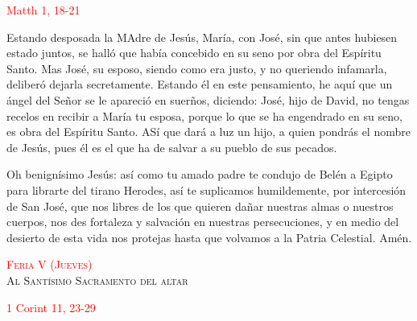 \documentclass[10pt]{article}
\begin{document}
\begin{multicols}{2}
      \hfill\textcolor{red}{Matth 1, 18-21}

      Estando desposada la MAdre de Jesús, María, con José, sin que antes hubiesen estado juntos, se halló que había concebido en su seno por obra del Espíritu Santo. Mas José, su esposo,
      siendo como era justo, y no queriendo infamarla, deliberó dejarla secretamente. Estando él en este pensamiento, he aquí que un ángel del Señor se le apareció en suerños, diciendo:
      José, hijo de David, no tengas recelos en recibir a María tu esposa, porque lo que se ha engendrado en su seno, es obra del Espíritu Santo. ASí que dará a luz un hijo, a quien pondrás
      el nombre de Jesús, pues él es el que ha de salvar a su pueblo de sus pecados.\newline

      \begin{otherlanguage}{latin}
            

            

            

      \end{otherlanguage}
      \newline

      Oh benignísimo Jesús: así como tu amado padre te condujo de Belén a Egipto para librarte del tirano Herodes, así te suplicamos humildemente, por intercesión de San José, que nos libres
      de los que quieren dañar nuestras almas o nuestros cuerpos, nos des fortaleza y salvación en nuestras persecuciones, y en medio del desierto de esta vida nos protejas hasta que volvamos
      a la Patria Celestial. Amén.

      \begin{center}
            \textsc{\textcolor{red}{Feria V (Jueves)}\\ {\large Al Santísimo Sacramento del altar}}
      \end{center}

      \hfill\textcolor{red}{1 Corint 11, 23-29}


\end{multicols}
\end{document}
